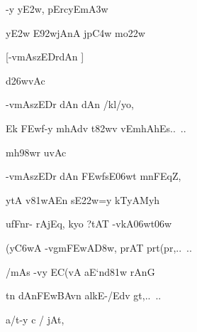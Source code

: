 \nemslokac

{\dn {}-y y\3E2w, pErcy\0Em\3A3w\2 }%
\dontdisplaylinenum


\nemslokad

{\dn y\3E2w\2 E\392wjAnA\2 jp\3C4w mo\322w \veg\dontdisplaylinenum }%


{\centerline{{\dn\large {\rs [\re}-vmA\2szEDrdAn {\rs ]\re}}}}


\vers


{\dn d\?\326wvAc{\dandab}\dontdisplaylinenum  }%

{\dn -vmA\2szEDr\2 dAn\2 dAn\2 /kl/yo,\thinspace{\danda} \dontdisplaylinenum }%


{\dn Ek\2 \3FEwf-y\2 mhAd\?v t\382wv\2 vEmhAh\0Es{..\dn\ ..} \veg\dontdisplaylinenum }%

  
{\dn mh\?\398wr uvAc{\dandab}\dontdisplaylinenum  }%

{\dn -vmA\2szEDr\2 dAn\2 \3FEwf\2sE\306wt mnFEqZ,\thinspace{\danda} \dontdisplaylinenum }%


{\dn {}ytA\2 v\0\381wAEn s\2E\322w=y kTyAMyh \veg\dontdisplaylinenum }%


{\dn ufFnr- rAjEq\0, kyo {\rs ?\re}tAT\?{\qvb} -vkA\306wt\306w \thinspace{\dandab} \dontdisplaylinenum }%


{\dn (y\3C6wA -vg\0m\3FEwA\3D8w, prAT\?{\qvb} prt(pr,{..\dn\ ..} \veg\dontdisplaylinenum }%


{\dn {}/mA\2s\2 -vy\2 EC(vA aE`nd\381w\2 rAnG\?\thinspace{\dandab} \dontdisplaylinenum }%


{\dn t\?n dAn\3FEwBAv\?n alk\0E-/Edv\2 gt,{..\dn\ ..} \veg\dontdisplaylinenum }%


\ujvers{}

\nemslokab

{\dn a/t-y c / jAt, \danda\dontdisplaylinenum }%

\nemslokac

